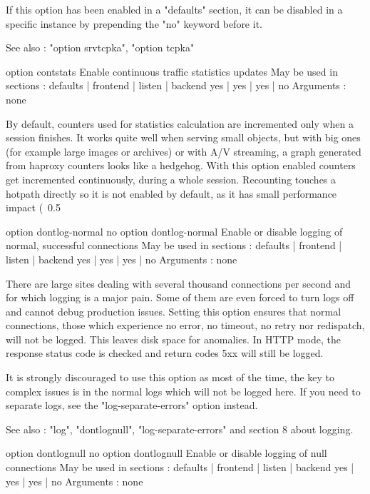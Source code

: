   If this option has been enabled in a "defaults" section, it can be disabled
  in a specific instance by prepending the "no" keyword before it.

  See also : "option srvtcpka", "option tcpka"


option contstats
  Enable continuous traffic statistics updates
  May be used in sections :   defaults | frontend | listen | backend
                                 yes   |    yes   |   yes  |   no
  Arguments : none

  By default, counters used for statistics calculation are incremented
  only when a session finishes. It works quite well when serving small
  objects, but with big ones (for example large images or archives) or
  with A/V streaming, a graph generated from haproxy counters looks like
  a hedgehog. With this option enabled counters get incremented continuously,
  during a whole session. Recounting touches a hotpath directly so
  it is not enabled by default, as it has small performance impact (~0.5%


option dontlog-normal
no option dontlog-normal
  Enable or disable logging of normal, successful connections
  May be used in sections :   defaults | frontend | listen | backend
                                 yes   |    yes   |   yes  |   no
  Arguments : none

  There are large sites dealing with several thousand connections per second
  and for which logging is a major pain. Some of them are even forced to turn
  logs off and cannot debug production issues. Setting this option ensures that
  normal connections, those which experience no error, no timeout, no retry nor
  redispatch, will not be logged. This leaves disk space for anomalies. In HTTP
  mode, the response status code is checked and return codes 5xx will still be
  logged.

  It is strongly discouraged to use this option as most of the time, the key to
  complex issues is in the normal logs which will not be logged here. If you
  need to separate logs, see the "log-separate-errors" option instead.

  See also : "log", "dontlognull", "log-separate-errors" and section 8 about
             logging.


option dontlognull
no option dontlognull
  Enable or disable logging of null connections
  May be used in sections :   defaults | frontend | listen | backend
                                 yes   |    yes   |   yes  |   no
  Arguments : none

